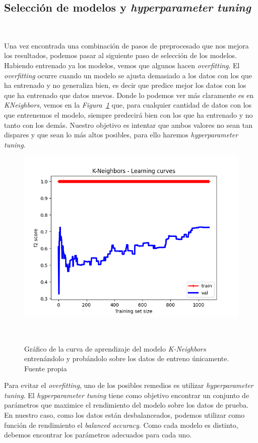 \subsection{Selección de modelos y \textit{hyperparameter tuning}}\ \label{sec:entrenamiento}

Una vez encontrada una combinación de pasos de preprocesado que nos mejora los resultados, podemos pasar al siguiente paso de selección de los modelos. Habiendo entrenado ya los modelos, vemos que algunos hacen \textit{overfitting}. El \textit{overfitting} ocurre cuando un modelo se ajusta demasiado a los datos con los que ha entrenado y no generaliza bien, es decir que predice mejor los datos con los que ha entrenado que datos nuevos. Donde lo podemos ver más claramente es en \textit{KNeighbors}, vemos en la \textit{Figura\ \ref{fig:lc-knn}} que, para cualquier cantidad de datos con los que entrenemos el modelo, siempre predecirá bien con los que ha entrenado y no tanto con los demás. Nuestro objetivo es intentar que ambos valores no sean tan dispares y que sean lo más altos posibles, para ello haremos \textit{hyperparameter tuning}.

\begin{figure}[!h]
    \centering
    \includegraphics[width=0.7\linewidth]{media/images/learing-curves-knn.png}
    \caption{Gráfico de la curva de aprendizaje del modelo \textit{K-Neighbors} entrenándolo y probándolo sobre los datos de entreno únicamente. Fuente propia}\ \label{fig:lc-knn}
\end{figure}

Para evitar el \textit{overfitting}, uno de los posibles remedios es utilizar \textit{hyperparameter tuning}. El \textit{hyperparameter tuning} tiene como objetivo encontrar un conjunto de parámetros que maximice el rendimiento del modelo sobre los datos de prueba. En nuestro caso, como los datos están desbalanceados, podemos utilizar como función de rendimiento el \textit{balanced accuracy}. Como cada modelo es distinto, debemos encontrar los parámetros adecuados para cada uno. 

